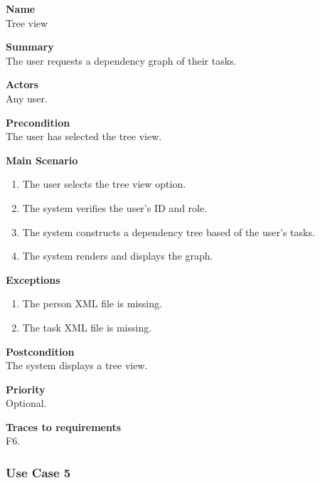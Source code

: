 \documentclass[12pt]{article}
\begin{document}
\noindent
{\bf Name}\\
Tree view

\noindent
{\bf Summary}\\
The user requests a dependency graph of their tasks.

\noindent
{\bf Actors}\\
Any user.

\noindent
{\bf Precondition}\\
The user has selected the tree view.

\noindent
{\bf Main Scenario}\\
\vspace*{-0.35in}
\begin{enumerate}
\item The user selects the tree view option.
\vspace*{-0.1in}
\item The system verifies the user's ID and role.
\vspace*{-0.1in}
\item The system constructs a dependency tree based of the user's tasks.
\vspace*{-0.1in}
\item The system renders and displays the graph.
\end{enumerate}
\vspace*{-0.1in}

\noindent
{\bf Exceptions}\\
\vspace*{-0.35in}
\begin{enumerate}
\item The person XML file is missing.
\vspace*{-0.1in}
\item The task XML file is missing.
\end{enumerate}
\vspace*{-0.1in}

\noindent
{\bf Postcondition}\\
The system displays a tree view.

\noindent
{\bf Priority}\\
Optional.

\noindent
{\bf Traces to requirements}\\
F6.

\subsubsection{Use Case 5} \label{uc:5}
\end{document}
